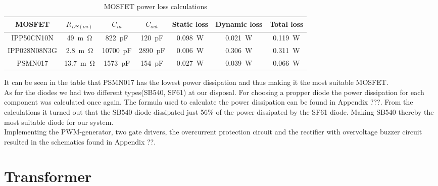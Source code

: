 \documentclass[11pt,titlepage]{report}
\begin{document}
\begin{table}[H]
	\centering
	\caption{MOSFET power loss calculations}
	\label{tab:ass2-power-loss}
	\begin{tabular}{c c c c c c c}
		\hline\hline
		MOSFET & $R_{DS(on)}$ & $C_{in}$ & $C_{out}$ & Static loss & Dynamic loss & Total loss \\
		\hline
		IPP50CN10N & \SI{49}{m\ohm} & \SI{822}{pF} & \SI{120}{pF} & \SI{0.098}{W} & \SI{0.021}{W} & \SI{0.119}{W} \\
		IPP028N08N3G & \SI{2.8}{m\ohm} & \SI{10700}{pF} & \SI{2890}{pF} & \SI{0.006}{W} & \SI{0.306}{W} & \SI{0.311}{W} \\
		PSMN017 & \SI{13.7}{m\ohm} & \SI{1573}{pF} & \SI{154}{pF} & \SI{0.027}{W} & \SI{0.039}{W} & \SI{0.066}{W} \\
		\hline
		\end{tabular}
\end{table}

It can be seen in the table that PSMN017 has the lowest power dissipation and thus making it the most suitable MOSFET. \\ 
As for the diodes we had two different types(SB540, SF61) at our disposal. For choosing a propper diode the power dissipation for each component was calculated once again. The formula used to calculate the power dissipation can be found in Appendix ???. From the calculations it turned out that the SB540 diode dissipated just 56\% of the power dissipated by the SF61 diode. Making SB540 thereby the most suitable diode for our system. \\ 
Implementing the PWM-generator, two gate drivers, the overcurrent protection circuit and the rectifier
with overvoltage buzzer circuit resulted in the schematics found in Appendix ??. 


\section{Transformer}
\end{document}

